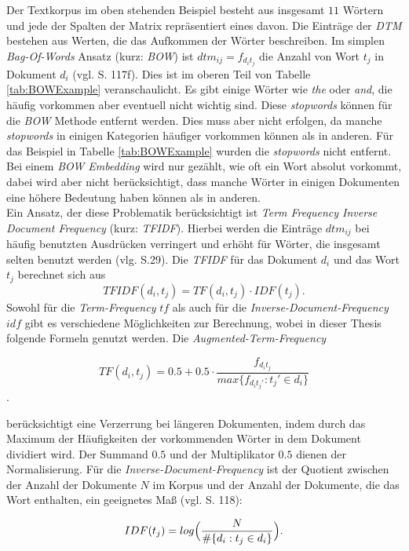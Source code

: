 \documentclass[a4paper,11pt]{article}
\begin{document}
Der Textkorpus im oben stehenden Beispiel besteht aus insgesamt $11$ Wörtern und jede der Spalten der Matrix repräsentiert eines davon.
Die Einträge der \textit{DTM} bestehen aus Werten, die das Aufkommen der Wörter beschreiben. Im simplen \textit{Bag-Of-Words} Ansatz (kurz: \textit{BOW}) ist $dtm_{ij} = f_{d_i t_j}$ die Anzahl von Wort $t_j$ in Dokument $d_i$ (vgl. \cite{deepEssentials} S. 117f). Dies ist im oberen Teil von Tabelle \ref{tab:BOWExample} veranschaulicht. Es gibt einige Wörter wie \textit{the} oder \textit{and}, die häufig vorkommen aber eventuell nicht wichtig sind. Diese \textit{stopwords} können für die \textit{BOW} Methode entfernt werden. Dies muss aber nicht erfolgen, da manche \textit{stopwords} in einigen Kategorien häufiger vorkommen können als in anderen. Für das Beispiel in Tabelle \ref{tab:BOWExample} wurden die \textit{stopwords} nicht entfernt.
Bei einem \textit{BOW Embedding} wird nur gezählt, wie oft ein Wort absolut vorkommt, dabei wird aber nicht berücksichtigt, dass manche Wörter in einigen Dokumenten eine höhere Bedeutung haben können als in anderen. \\

Ein Ansatz, der diese Problematik berücksichtigt ist \textit{Term Frequency Inverse Document Frequency} (kurz: \textit{TFIDF}). Hierbei werden die Einträge $dtm_{ij}$ bei häufig benutzten Ausdrücken verringert und erhöht für Wörter, die insgesamt selten benutzt werden (vlg. \cite{textMiningR} S.29). Die \textit{TFIDF} für das Dokument $d_i$ und das Wort $t_j$ berechnet sich aus 
\[TFIDF(d_i, t_j) = TF(d_i,t_j) \cdot IDF(t_j) . \]
Sowohl für die \textit{Term-Frequency} $tf$ als auch für die \textit{Inverse-Document-Frequency} $idf$ gibt es verschiedene Möglichkeiten zur Berechnung, wobei in dieser Thesis folgende Formeln genutzt werden.
Die \textit{Augmented-Term-Frequency}

\[TF(d_i,t_j) = 0.5 +  0.5 \cdot \frac{f_{d_i t_j}}{max \{ f_{d_i t_j'}: t_j' \in d_i \}} \].

berücksichtigt eine Verzerrung bei längeren Dokumenten, indem durch das Maximum der Häufigkeiten der vorkommenden Wörter in dem Dokument dividiert wird. Der Summand $0.5$ und der Multiplikator $0.5$ dienen der Normalisierung. Für die \textit{Inverse-Document-Frequency} ist der Quotient zwischen der Anzahl der Dokumente $N$ im Korpus und der Anzahl der Dokumente, die das Wort enthalten, ein geeignetes Maß (vgl. \cite{deepEssentials} S. 118):

\[IDF(t_j) = log \Bigl( \frac{N}{\# \{d_i: t_j \in d_i \}} \Bigr) .\]
\end{document}
